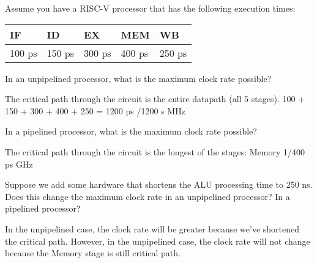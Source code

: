 \begin{blocksection}
\question
Assume you have a RISC-V processor that has the following execution times:

\begin{tabular}{ |l|l|l|l|l| } 
 \hline
 IF & ID & EX & MEM & WB \\
 \hline
 100 ps & 150 ps & 300 ps & 400 ps & 250 ps \\
 \hline
\end{tabular}

\begin{parts}
\item In an unpipelined processor, what is the maximum clock rate possible?

\begin{solution}
The critical path through the circuit is the entire datapath (all 5 stages).
100 + 150 + 300 + 400 + 250 = 1200 ps /1200 s  MHz
\end{solution}

\item In a pipelined processor, what is the maximum clock rate possible?

\begin{solution}
The critical path through the circuit is the longest of the stages: Memory
1/400 ps  GHz
\end{solution}

\item Suppose we add some hardware that shortens the ALU processing time to 250 ns. Does this change the maximum clock rate in an unpipelined processor? In a pipelined processor?

\begin{solution}
In the unpipelined case, the clock rate will be greater because we’ve shortened the critical path. However, in the unpipelined case, the clock rate will not change because the Memory stage is still critical path.
\end{solution}

\end{parts}
\end{blocksection}